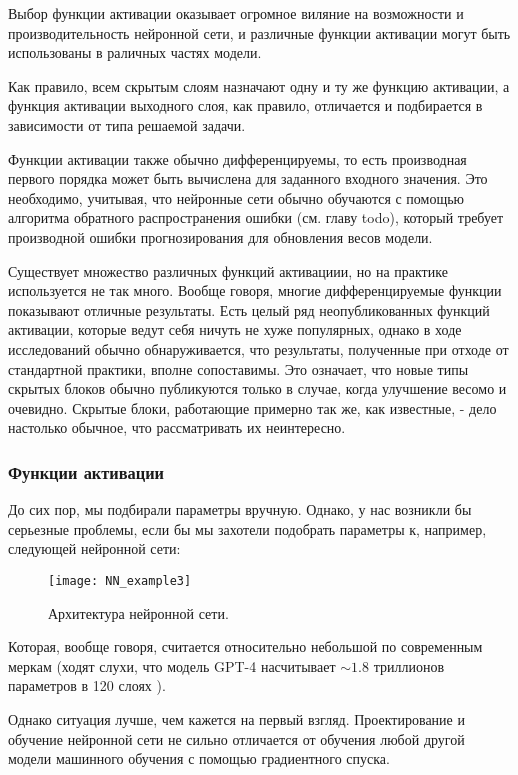 Выбор функции активации оказывает огромное виляние на возможности и производительность 
нейронной сети, и различные функции активации могут быть использованы в раличных частях модели.

Как правило, всем скрытым слоям назначают одну и ту же функцию активации, 
а функция активации выходного слоя, как правило, отличается и подбирается в 
зависимости от типа решаемой задачи.

Функции активации также обычно дифференцируемы, то есть производная первого порядка 
может быть вычислена для заданного входного значения. Это необходимо, учитывая, что 
нейронные сети обычно обучаются с помощью алгоритма обратного распространения ошибки 
(см. главу {\color{red} todo}), 
который требует производной ошибки прогнозирования для обновления весов модели.

Существует множество различных функций активациии, но на практике используется не 
так много. Вообще говоря, многие дифференцируемые функции показывают отличные результаты. 
Есть целый ряд неопубликованных функций активации, которые ведут
себя ничуть не хуже популярных, однако в ходе исследований обычно 
обнаруживается, что результаты, полученные при отходе от стандартной практики, 
вполне сопоставимы. Это означает, что новые типы скрытых блоков
обычно публикуются только в случае, когда улучшение весомо и очевидно. Скрытые
блоки, работающие примерно так же, как известные, - дело настолько обычное, что
рассматривать их неинтересно.

\subsubsection{Функции активации}

До сих пор, мы подбирали параметры вручную. Однако, у нас возникли бы серьезные 
проблемы, если бы мы захотели подобрать параметры к, например, следующей нейронной сети:

\begin{figure}[h!]
    \centering
    \texttt{[image: NN\_example3]}
    \caption{Архитектура нейронной сети.}
    \label{fig:NN3}
\end{figure}

Которая, вообще говоря, считается относительно небольшой по современным меркам 
(ходят слухи, что модель GPT-4 насчитывает $\sim 1.8$ триллионов параметров в 
120 слоях \cite{gpt4_architecture}).

Однако ситуация лучше, чем кажется на первый взгляд. 
Проектирование и обучение нейронной сети не сильно отличается от обучения 
любой другой модели машинного обучения с помощью градиентного спуска. 

